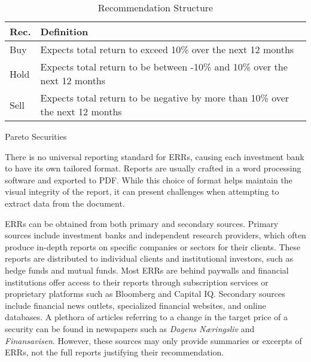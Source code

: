\begin{table}[!h]
    \begin{subtable}{\textwidth}
        \begin{tabularx}{\linewidth}{ll}
            \toprule
            \textbf{Rec.} & \textbf{Definition} \\ 
            \midrule
            Buy & Expects total return to exceed 10\% over the next 12 months \\
            Hold & Expects total return to be between -10\% and 10\% over the next 12 months \\ 
            Sell & Expects total return to be negative by more than 10\% over the next 12 months \\
            \bottomrule
        \end{tabularx}
        \caption{Pareto Securities}
        \label{subtab:pareto}
    \end{subtable}

    \caption{Recommendation Structure}
    \label{tab:master}
\end{table}

There is no universal reporting standard for ERRs, causing each investment bank to have its own tailored format. Reports are usually crafted in a word processing software and exported to PDF. While this choice of format helps maintain the visual integrity of the report, it can present challenges when attempting to extract data from the document. 


ERRs can be obtained from both primary and secondary sources. Primary sources include investment banks and independent research providers, which often produce in-depth reports on specific companies or sectors for their clients. These reports are distributed to individual clients and institutional investors, such as hedge funds and mutual funds. Most ERRs are behind paywalls and financial institutions offer access to their reports through subscription services or proprietary platforms such as Bloomberg and Capital IQ. Secondary sources include financial news outlets, specialized financial websites, and online databases. A plethora of articles referring to a change in the target price of a security can be found in newspapers such as \textit{Dagens Næringsliv} and \textit{Finansavisen}. However, these sources may only provide summaries or excerpts of ERRs, not the full reports justifying their recommendation. %

